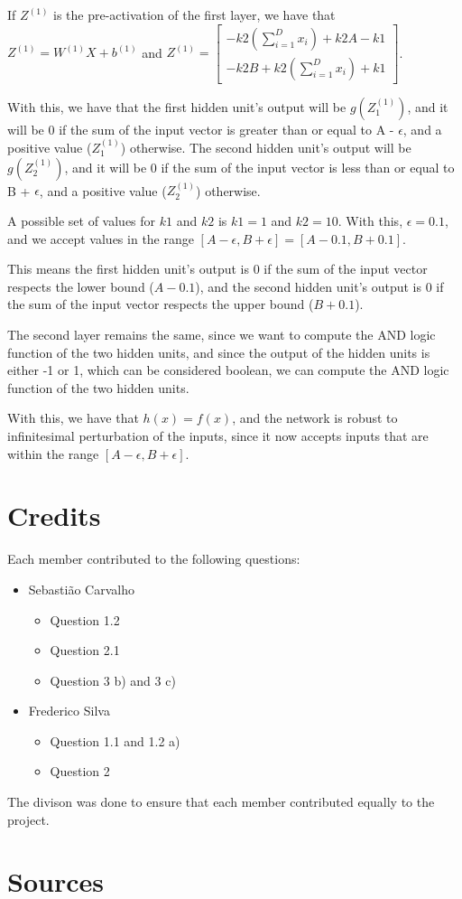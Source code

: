 \documentclass{article}
\begin{document}
\bigskip

If $Z^{(1)}$ is the pre-activation of the first layer, we have that $Z^{(1)} = W^{(1)}X + b^{(1)}$ and
$Z^{(1)} = \begin{bmatrix}
    -k2(\sum_{i=1}^{D} x_i) + k2A - k1\\
    -k2B + k2(\sum_{i=1}^{D} x_i) + k1
\end{bmatrix}
$.

\bigskip

With this, we have that the first hidden unit's output will be $g(Z^{(1)}_1)$, and it will be 0 if the sum of the 
input vector is greater than or equal to A - $\epsilon$, and a positive value ($Z^{(1)}_1$) otherwise. 
The second hidden unit's output will be $g(Z^{(1)}_2)$, and it will be 0 if the sum of the input vector is less than or equal 
to B + $\epsilon$, and a positive value ($Z^{(1)}_2$) otherwise.

A possible set of values for $k1$ and $k2$ is $k1 = 1$ and $k2 = 10$. With this, $\epsilon = 0.1$, and we accept values in
the range $[A - \epsilon, B + \epsilon] = [A - 0.1, B + 0.1]$.

This means the first hidden unit's output is 0 if the sum of the input vector respects the lower bound ($A - 0.1$),
and the second hidden unit's output is 0 if the sum of the input vector respects the upper bound ($B + 0.1$).

\bigskip

The second layer remains the same, since we want to compute the AND logic function of the two hidden units, and since the output of
the hidden units is either -1 or 1, which can be considered boolean, we can compute the AND logic function of the two hidden units.

With this, we have that \(h(x) = f(x)\), and the network is robust to infinitesimal perturbation of the inputs, since it now accepts inputs
that are within the range \([A - \epsilon, B + \epsilon]\).

\section{Credits}

Each member contributed to the following questions:

\begin{itemize}
    \item Sebastião Carvalho 
    \begin{itemize}
        \item Question 1.2
        \item Question 2.1
        \item Question 3 b) and 3 c)
    \end{itemize}
    \item Frederico Silva
    \begin{itemize}
        \item Question 1.1 and 1.2 a)
        \item Question 2
    \end{itemize}
\end{itemize}

\smallskip

The divison was done to ensure that each member contributed equally to the project.

\section{Sources}
\end{document}
